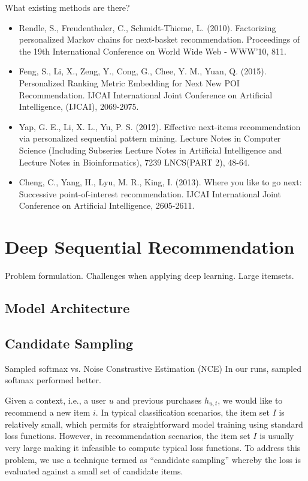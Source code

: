 \documentclass{sig-alternate-05-2015}
\begin{document}
What existing methods are there?
\begin{itemize}
\item Rendle, S., Freudenthaler, C., Schmidt-Thieme, L. (2010). Factorizing personalized Markov chains for next-basket recommendation. Proceedings of the 19th International Conference on World Wide Web - WWW'10, 811.
\item Feng, S., Li, X., Zeng, Y., Cong, G., Chee, Y. M., Yuan, Q. (2015). Personalized Ranking Metric Embedding for Next New POI Recommendation. IJCAI International Joint Conference on Artificial Intelligence, (IJCAI), 2069-2075.
\item Yap, G. E., Li, X. L., Yu, P. S. (2012). Effective next-items recommendation via personalized sequential pattern mining. Lecture Notes in Computer Science (Including Subseries Lecture Notes in Artificial Intelligence and Lecture Notes in Bioinformatics), 7239 LNCS(PART 2), 48-64.
\item Cheng, C., Yang, H., Lyu, M. R., King, I. (2013). Where you like to go next: Successive point-of-interest recommendation. IJCAI International Joint Conference on Artificial Intelligence, 2605-2611.
\end{itemize}
 
\section{Deep Sequential Recommendation}

Problem formulation. Challenges when applying deep learning. Large itemsets. 

\subsection{Model Architecture}

\subsection{Candidate Sampling}
Sampled softmax vs. Noise Constrastive Estimation (NCE)
In our runs, sampled softmax performed better. 

Given a context, i.e., a user $u$ and previous purchases $h_{u,t}$, we would like to recommend a new item $i$. In typical classification scenarios, the item set $I$ is relatively small, which permits for straightforward model training using standard loss functions. However, in recommendation scenarios, the item set $I$ is usually very large making it infeasible to compute typical loss functions. To address this problem, we use a technique termed as ``candidate sampling'' whereby the loss is evaluated against a small set of candidate items. 
\end{document}
